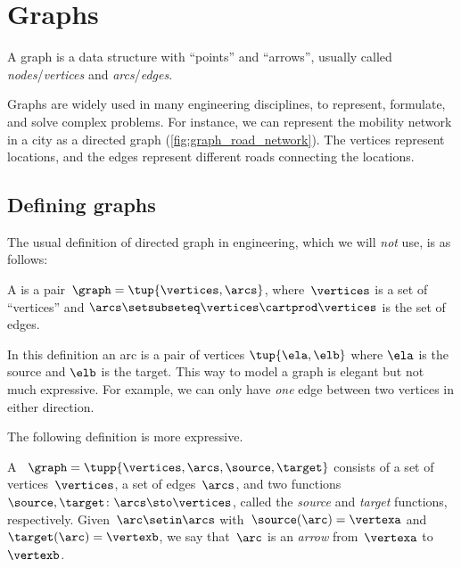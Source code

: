 
\section{Graphs}

A graph is a data structure with ``points'' and ``arrows'', usually called \emph{no\-des}/\emph{ver\-tices} and \emph{arcs}/\emph{edges}.

\begin{marginfigure}
    \caption{\label{fig:graph_road_network}}
\end{marginfigure}

Graphs are widely used in many engineering disciplines, to represent, formulate, and solve complex problems.
For instance, we can represent the mobility network in a city as a directed graph (\cref{fig:graph_road_network}).
The vertices represent locations, and the edges represent different roads connecting the locations.

\subsection{Defining graphs}

The usual definition of directed graph in engineering, which we will \emph{not} use, is as follows:

\begin{definition}
    \label{def:directed-graph}
    A \emph{} is a pair~$\graph=\tup{\vertices, \arcs}$, where~$\vertices$ is
    a set of ``vertices'' and $\arcs \setsubseteq \vertices \cartprod \vertices$ is the set of edges.
\end{definition}
In this definition an arc is a pair of vertices $\tup{\ela,\elb}$ where $\ela$ is the source and $\elb$ is the target.
This way to model a graph is elegant but not much expressive.
For example, we can only have \emph{one} edge between two vertices in either direction.

The following definition is more expressive.

\begin{definition}
    \label{def:Graph}
    A \emph{}~$\graph=\tupp{\vertices,\arcs, \source,\target}$ consists of a set of vertices~$\vertices$, a set of edges~$\arcs$, and two functions~$\source,\target \colon \arcs \sto \vertices$, called the \emph{source} and \emph{target} functions, respectively.
    Given~$\arc\setin \arcs$ with~$\source(\arc)=\vertexa$ and~$\target(\arc)=\vertexb$, we say that~$\arc$ is an \emph{arrow} from~$\vertexa$ to~$\vertexb$.
\end{definition}

